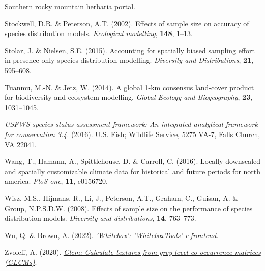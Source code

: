 \documentclass[
]{article}
\newlength{\cslhangindent}
\newlength{\cslentryspacingunit} %
\newenvironment{CSLReferences}[2] %
 {%
  \setlength{\parindent}{0pt}
  \ifodd #1
  \let\oldpar\par
  \def\par{\hangindent=\cslhangindent\oldpar}
  \fi
  \setlength{\parskip}{#2\cslentryspacingunit}
 }%
 {}
\begin{document}
\begin{CSLReferences}{1}{0}
\leavevmode{}%
Southern rocky mountain herbaria portal.

\leavevmode{}%
Stockwell, D.R. \& Peterson, A.T. (2002). Effects of sample size on
accuracy of species distribution models. \emph{Ecological modelling},
\textbf{148}, 1--13.

\leavevmode{}%
Stolar, J. \& Nielsen, S.E. (2015). Accounting for spatially biased
sampling effort in presence-only species distribution modelling.
\emph{Diversity and Distributions}, \textbf{21}, 595--608.

\leavevmode{}%
Tuanmu, M.-N. \& Jetz, W. (2014). A global 1-km consensus land-cover
product for biodiversity and ecosystem modelling. \emph{Global Ecology
and Biogeography}, \textbf{23}, 1031--1045.

\leavevmode{}%
\emph{USFWS species status assessment framework: An integrated
analytical framework for conservation 3.4}. (2016). U.S. Fish; Wildlife
Service, 5275 VA-7, Falls Church, VA 22041.

\leavevmode{}%
Wang, T., Hamann, A., Spittlehouse, D. \& Carroll, C. (2016). Locally
downscaled and spatially customizable climate data for historical and
future periods for north america. \emph{PloS one}, \textbf{11},
e0156720.

\leavevmode{}%
Wisz, M.S., Hijmans, R., Li, J., Peterson, A.T., Graham, C., Guisan, A.
\& Group, N.P.S.D.W. (2008). Effects of sample size on the performance
of species distribution models. \emph{Diversity and distributions},
\textbf{14}, 763--773.

\leavevmode{}%
Wu, Q. \& Brown, A. (2022).
\emph{\href{https://CRAN.R-project.org/package=whitebox}{'Whitebox':
'WhiteboxTools' r frontend}}.

\leavevmode{}%
Zvoleff, A. (2020).
\emph{\href{https://CRAN.R-project.org/package=glcm}{Glcm: Calculate
textures from grey-level co-occurrence matrices (GLCMs)}}.

\end{CSLReferences}
\end{document}
